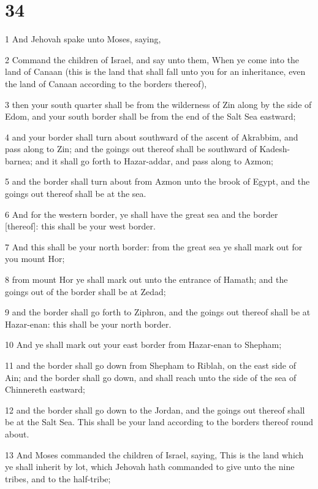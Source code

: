 \chapter{34}

\par 1 And Jehovah spake unto Moses, saying,
\par 2 Command the children of Israel, and say unto them, When ye come into the land of Canaan (this is the land that shall fall unto you for an inheritance, even the land of Canaan according to the borders thereof),
\par 3 then your south quarter shall be from the wilderness of Zin along by the side of Edom, and your south border shall be from the end of the Salt Sea eastward;
\par 4 and your border shall turn about southward of the ascent of Akrabbim, and pass along to Zin; and the goings out thereof shall be southward of Kadesh-barnea; and it shall go forth to Hazar-addar, and pass along to Azmon;
\par 5 and the border shall turn about from Azmon unto the brook of Egypt, and the goings out thereof shall be at the sea.
\par 6 And for the western border, ye shall have the great sea and the border [thereof]: this shall be your west border.
\par 7 And this shall be your north border: from the great sea ye shall mark out for you mount Hor;
\par 8 from mount Hor ye shall mark out unto the entrance of Hamath; and the goings out of the border shall be at Zedad;
\par 9 and the border shall go forth to Ziphron, and the goings out thereof shall be at Hazar-enan: this shall be your north border.
\par 10 And ye shall mark out your east border from Hazar-enan to Shepham;
\par 11 and the border shall go down from Shepham to Riblah, on the east side of Ain; and the border shall go down, and shall reach unto the side of the sea of Chinnereth eastward;
\par 12 and the border shall go down to the Jordan, and the goings out thereof shall be at the Salt Sea. This shall be your land according to the borders thereof round about.
\par 13 And Moses commanded the children of Israel, saying, This is the land which ye shall inherit by lot, which Jehovah hath commanded to give unto the nine tribes, and to the half-tribe;
